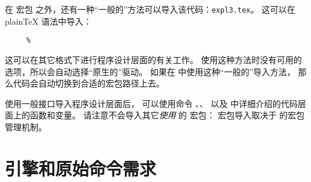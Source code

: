 \documentclass[full]{l3doc}
\begin{document}
%
在 \LaTeXe{} 宏包  之外，还有一种“一般的”方法可以导入该代码：\texttt{expl3.tex}。
这可以在 plain\TeX{} 语法中导入：
\begin{verbatim}
     %
\end{verbatim}
这可以在其它格式下进行程序设计层面的有关工作。
使用这种方法时没有可用的选项，所以会自动选择“原生的”驱动。
如果在 \LaTeXe{} 中使用这种“一般的”导入方法，
那么代码会自动切换到合适的宏包路径上去。

%
使用一般接口导入程序设计层面后，
可以使用命令 、、
以及  中详细介绍的代码层面上的函数和变量。
请注意不会导入其它\emph{使用}  的 \LaTeXe{} 宏包：
宏包导入取决于 \LaTeXe{} 的宏包管理机制。

%
\section{引擎和原始命令需求}
\end{document}
